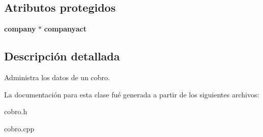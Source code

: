 \subsection*{Atributos protegidos}
\begin{CompactItemize}
\item 
{\bf company} $\ast$ {\bf companyact}\label{classCobro_p0}

\end{CompactItemize}


\subsection{Descripci\'{o}n detallada}
Administra los datos de un cobro. 



La documentaci\'{o}n para esta clase fu\'{e} generada a partir de los siguientes archivos:\begin{CompactItemize}
\item 
cobro.h\item 
cobro.cpp\end{CompactItemize}
